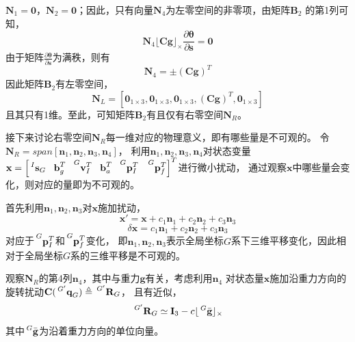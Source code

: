 \documentclass{article}
\begin{document}
$\textbf{N}_1=\textbf{0}$，$\textbf{N}_2=\textbf{0}$；因此，只有向量$\textbf{N}_4$为左零空间的非零项，由矩阵$\textbf{B}_2$
的第1列可知，
\begin{equation}
    \textbf{N}_{4}\lfloor\textbf{Cg}\rfloor_{\times}\frac{\partial\mathbf{\theta}}{\partial\textbf{s}}=\textbf{0}
\end{equation}
由于矩阵$\frac{\partial\mathbf{\theta}}{\partial\textbf{s}}$为满秩，则有
\begin{equation}
    \textbf{N}_4=\pm(\textbf{Cg})^T
\end{equation}
因此矩阵$\textbf{B}_2$有左零空间，
\begin{equation}
    \textbf{N}_L=\left[\textbf{0}_{1\times 3},\textbf{0}_{1\times 3},\textbf{0}_{1\times 3},(\textbf{Cg})^T,\textbf{0}_{1\times 3}\right]
\end{equation}
且其只有1维。至此，可知矩阵$\textbf{B}_2$有且仅有右零空间$\textbf{N}_R$。

\par
接下来讨论右零空间$\textbf{N}_R$每一维对应的物理意义，即有哪些量是不可观的。
令$\textbf{N}_R=span\left[\textbf{n}_{1},\textbf{n}_{2},\textbf{n}_{3},\textbf{n}_{4}\right]$，
利用$\textbf{n}_{1},\textbf{n}_{2},\textbf{n}_{3},\textbf{n}_{4}$对状态变量
$\textbf{x}=\left[\sideset{^I}{}{\mathop{\textbf{s}_{G}}}\ \ \textbf{b}_{g}^{T}
\ \ \sideset{^G}{}{\mathop{\textbf{v}_{I}^{T}}}\ \ \textbf{b}_{a}^{T}\ \ \sideset{^G}{}{\mathop{\textbf{p}_{I}^{T}}}
\ \ \sideset{^G}{}{\mathop{\textbf{p}_{f}^{T}}}\right]^T$进行微小扰动，
通过观察$\textbf{x}$中哪些量会变化，则对应的量即为不可观的。
\par
首先利用$\textbf{n}_{1},\textbf{n}_{2},\textbf{n}_{3}$对$\textbf{x}$施加扰动，
\begin{equation}
    \textbf{x}'=\textbf{x}+c_1\textbf{n}_1+c_2\textbf{n}_2+c_3\textbf{n}_3
\end{equation}
\begin{equation}
    \delta\textbf{x}=c_1\textbf{n}_1+c_2\textbf{n}_2+c_3\textbf{n}_3
\end{equation}
对应于$\sideset{^G}{}{\mathop{\textbf{p}_{I}^{T}}}$和$\sideset{^G}{}{\mathop{\textbf{p}_{f}^{T}}}$变化，
即$\textbf{n}_1,\textbf{n}_2,\textbf{n}_3$表示全局坐标$G$系下三维平移变化，因此相对于全局坐标$G$系的三维平移是不可观的。

\par
观察$\textbf{N}_R$的第4列$\textbf{n}_4$，其中与重力$\textbf{g}$有关，考虑利用$\textbf{n}_4$
对状态量$\textbf{x}$施加沿重力方向的旋转扰动$\textbf{C}(\sideset{^{G'}}{}{\mathop{\textbf{q}_G}})\triangleq\sideset{^{G'}}{}{\mathop{\textbf{R}_G}}$，
且有近似，
\begin{equation}
    \sideset{^{G'}}{}{\mathop{\textbf{R}_G}}\simeq \textbf{I}_3-c\lfloor\sideset{^G}{}{\mathop{\bar{\textbf{g}}}}\rfloor_{\times}
\end{equation}
其中$\sideset{^G}{}{\mathop{\bar{\textbf{g}}}}$为沿着重力方向的单位向量。
\end{document}
